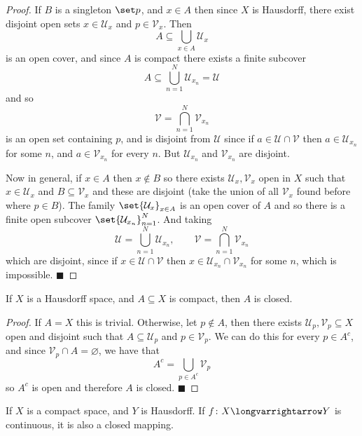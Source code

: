 \documentclass[10pt]{article}
\def\qed{\hskip1cm\penalty-100\hbox{}\hfill$\blacksquare$}
\def\mU{\mathcal{U}}
\def\mV{\mathcal{V}}
\def\longto{\longvarrightarrow}
\begin{document}
\begin{proof}

    If $B$ is a singleton $\set p$, and $x\in A$ then since $X$ is Hausdorff, there exist disjoint open sets $x\in\mU_x$ and $p\in\mV_x$.
    Then
    \[ A \subseteq \bigcup_{x\in A}\mU_x \]
    is an open cover, and since $A$ is compact there exists a finite subcover
    \[ A \subseteq \bigcup_{n=1}^N \mU_{x_n} = \mU \]
    and so
    \[ \mV = \bigcap_{n=1}^N \mV_{x_n} \]
    is an open set containing $p$, and is disjoint from $\mU$ since if $a\in\mU\cap\mV$ then $a\in\mU_{x_n}$ for some $n$, and $a\in\mV_{x_n}$ for every $n$.
    But $\mU_{x_n}$ and $\mV_{x_n}$ are disjoint.

    Now in general, if $x\in A$ then $x\notin B$ so there exists $\mU_x,\mV_x$ open in $X$ such that $x\in\mU_x$ and $B\subseteq\mV_x$ and these are disjoint
    (take the union of all $\mV_x$ found before where $p\in B$).
    The family $\set{\mU_x}_{x\in A}$ is an open cover of $A$ and so there is a finite open subcover $\set{\mU_{x_n}}_{n=1}^N$.
    And taking
    \[ \mU = \bigcup_{n=1}^N \mU_{x_n},\qquad \mV = \bigcap_{n=1}^N \mV_{x_n} \]
    which are disjoint, since if $x\in\mU\cap\mV$ then $x\in\mU_{x_n}\cap\mV_{x_n}$ for some $n$, which is impossible.
    \qed

\end{proof}

\begin{thrm*}

    If $X$ is a Hausdorff space, and $A\subseteq X$ is compact, then $A$ is closed.

\end{thrm*}

\begin{proof}

    If $A=X$ this is trivial.
    Otherwise, let $p\notin A$, then there exists $\mU_p,\mV_p\subseteq X$ open and disjoint such that $A\subseteq\mU_p$ and $p\in\mV_p$.
    We can do this for every $p\in A^c$, and since $\mV_p\cap A=\varnothing$, we have that
    \[ A^c = \bigcup_{p\in A^c}\mV_p \]
    so $A^c$ is open and therefore $A$ is closed.
    \qed

\end{proof}

\begin{prop*}

    If $X$ is a compact space, and $Y$ is Hausdorff.
    If $f\colon X\longto Y$ is continuous, it is also a closed mapping.

\end{prop*}
\end{document}
